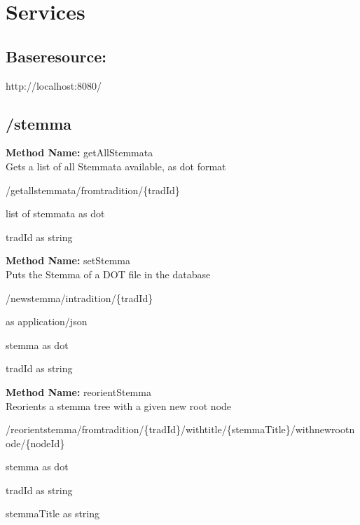 
\chapter{Services}
\section{Baseresource: }
http://localhost:8080/
\section{/stemma}
\textbf{Method Name: }getAllStemmata \\ Gets a list of all Stemmata available, as dot format
\begin{get}
/getallstemmata/fromtradition/\{tradId\}
\end{get}
\begin{response}
list of stemmata as dot
\end{response}
\begin{parameter}
tradId as string
\end{parameter}
\textbf{Method Name: }setStemma \\ Puts the Stemma of a DOT file in the database
\begin{post}
/newstemma/intradition/\{tradId\}
\end{post}
\begin{request}
 as application/json
\end{request}
\begin{response}
stemma as dot
\end{response}
\begin{parameter}
tradId as string
\end{parameter}
\textbf{Method Name: }reorientStemma \\ Reorients a stemma tree with a given new root node
\begin{post}
/reorientstemma/fromtradition/\{tradId\}/withtitle/\{stemmaTitle\}/withnewrootnode/\{nodeId\}
\end{post}
\begin{response}
stemma as dot
\end{response}
\begin{parameter}
tradId as string
\end{parameter}
\begin{parameter}
stemmaTitle as string
\end{parameter}
